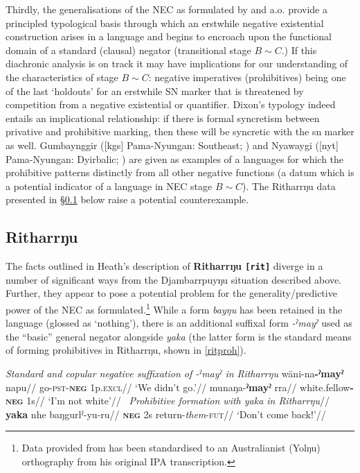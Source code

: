 \documentclass[usenames,dvipsnames,11pt]{article}
\begin{document}
{{ Thirdly, the generalisations of the NEC as formulated by \citet{Croft1991} and \citet{Veselinova2016} a.o. provide a principled typological basis through which an erstwhile negative existential construction arises in a language and begins to encroach upon the functional domain of a standard (clausal) negator (transitional stage $B\sim C$.) If this diachronic analysis is on track it may have implications for our understanding of the characteristics of stage $B\sim C$: negative imperatives (prohibitives) being one of the last `holdouts' for an erstwhile SN marker that is threatened by competition from a negative existential or quantifier.%
 Dixon's typology \citeyearpar[84]{Dixon2002a} indeed entails an implicational relationship: if there is formal syncretism between privative and prohibitive marking, then these will be syncretic with the \gls{sn} marker as well. Gumbaynggir ([\gls{kgs}] Pama-Nyungan: Southeast; \citealt{Eades1979}) and Nyawaygi ([\gls{nyt}] Pama-Nyungan: Dyirbalic; \citealt{Dixon1983}) are given as examples of a languages for which the prohibitive patterns distinctly from all other negative functions (a datum which is a potential indicator of a language in NEC stage $B\sim C$). The Ritharrŋu data presented in §\ref{secrit} below raise a potential counterexample.
\label{secdjr}

\subsection{Ritharrŋu}\label{secrit}


The facts outlined in Heath's \citeyear{Heath1980} description of {\bf Ritharrŋu {\tt[rit]}} diverge in a number of significant ways from the Djambarrpuyŋu situation described above. Further, they appear to pose a potential problem for the generality/predictive power of the NEC as formulated.\footnote{Data provided from \citet{Heath1980} has been standardised to an Australianist (Yolŋu) orthography from his original IPA transcription.} While a form \textit{bayŋu} has been retained in the language (glossed as `nothing'), there is an additional suffixal form \textit{-ˀmayˀ} used as the ``basic'' \citep[101]{Heath1980} general negator alongside \textit{yaka} (the latter form is the standard means of forming prohibitives in Ritharrŋu, shown in \ref{ritproh}).

\pex\textit{Standard and copular negative suffixation of {\em -ˀmayˀ} in Ritharrŋu}
\a\begingl\gla wäni-na\textbf{-ˀmayˀ} napu//
\glb go-\textsc{pst-\textbf{neg}} 1\gls{p}\textsc{.excl}//
\glft `We didn't go.'//\endgl
\a\begingl\gla munaŋa-\textbf{ˀmayˀ} rra//
\glb white.fellow\textsc{\textbf{-neg}} 1s//
\glft`I'm not white'//\endgl\xe 
\pex~\label{ritproh}\begingl\glpreamble\textit{Prohibitive formation with {\em yaka} in Ritharrŋu}//
\gla \textbf{yaka} nhe baŋgurlˀ-yu-ru//
\glb \textsc{\textbf{neg}} 2\gls{s} return-\textit{them}-\textsc{fut}//
\glft`Don't come back!'//\endgl\xe

}}
\end{document}
